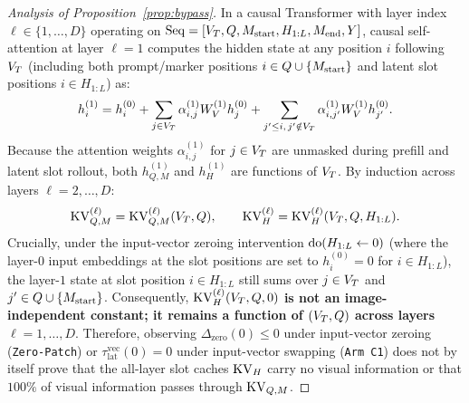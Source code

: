 \begin{proof}[Analysis of Proposition~\ref{prop:bypass}]
In a causal Transformer with layer index $\ell \in \{1, \dots, D\}$ operating on $\mathrm{Seq} = [V_T, Q, M_{\mathrm{start}}, H_{1:L}, M_{\mathrm{end}}, Y]$, causal self-attention at layer $\ell = 1$ computes the hidden state at any position $i$ following $V_T$ (including both prompt/marker positions $i \in Q \cup \{M_{\mathrm{start}}\}$ and latent slot positions $i \in H_{1:L}$) as:
\begin{equation}
  h_i^{(1)} = h_i^{(0)} + \sum_{j \in V_T} \alpha_{i,j}^{(1)} W_V^{(1)} h_j^{(0)} + \sum_{j' \le i,\, j' \notin V_T} \alpha_{i,j'}^{(1)} W_V^{(1)} h_{j'}^{(0)}.
\end{equation}
Because the attention weights $\alpha_{i,j}^{(1)}$ for $j \in V_T$ are unmasked during prefill and latent slot rollout, both $h_{Q,M}^{(1)}$ and $h_H^{(1)}$ are functions of $V_T$. By induction across layers $\ell = 2, \dots, D$:
\begin{equation}
  \mathrm{KV}_{Q,M}^{(\ell)} = \mathrm{KV}_{Q,M}^{(\ell)}(V_T, Q), \qquad \mathrm{KV}_H^{(\ell)} = \mathrm{KV}_H^{(\ell)}(V_T, Q, H_{1:L}).
\end{equation}
Crucially, under the input-vector zeroing intervention $\mathrm{do}(H_{1:L} \leftarrow 0)$ (where the layer-$0$ input embeddings at the slot positions are set to $h_i^{(0)} = 0$ for $i \in H_{1:L}$), the layer-$1$ state at slot position $i \in H_{1:L}$ still sums over $j \in V_T$ and $j' \in Q \cup \{M_{\mathrm{start}}\}$. Consequently, \textbf{$\mathrm{KV}_H^{(\ell)}(V_T, Q, 0)$ is not an image-independent constant; it remains a function of $(V_T, Q)$ across layers $\ell = 1, \dots, D$}. Therefore, observing $\Delta_{\mathrm{zero}}(0) \le 0$ under input-vector zeroing (\texttt{Zero-Patch}) or $\tau_{\mathrm{lat}}^{\mathrm{vec}}(0) = 0$ under input-vector swapping (\texttt{Arm C1}) does not by itself prove that the all-layer slot caches $\mathrm{KV}_H$ carry no visual information or that $100\%$ of visual information passes through $\mathrm{KV}_{Q,M}$.


\end{proof}
